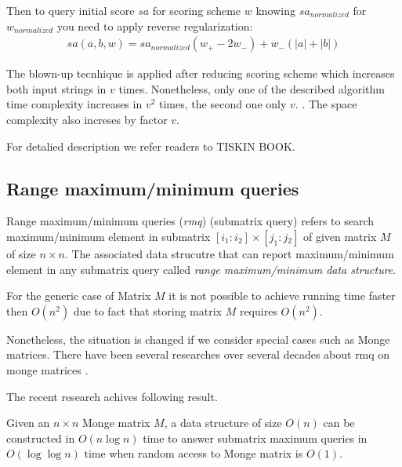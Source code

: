 Then to query initial score $sa$ for scoring scheme $w$
knowing $sa_{normalized}$ for $w_{normalized}$ you need to apply reverse regularization:
\begin{equation}
    \begin{aligned}
    sa(a,b,w) = sa_{normalized}  (w_{+} - 2w_{-}) +  w_{-} (|a| + |b|)
\end{aligned}
\end{equation}

The blown-up tecnhique is applied after reducing scoring scheme
which increases both input strings in $v$ times.
Nonetheless, only one of the described algorithm time complexity increases in $v^{2}$ times, the second one only $v$. .
The space complexity also increses by factor $v$. 


For detalied description we refer readers to TISKIN BOOK\cite{}.

 
\subsection{Range maximum/minimum queries}

Range maximum/minimum queries (\emph{rmq}) (submatrix query)  refers to search maximum/minimum element in submatrix $[i_{1}:i{_2}]\times [j_{1}:j{_2}]$ of given matrix $M$ of size $n\times n$.
The associated data strucutre that can report maximum/minimum element in any  submatrix query called \emph{range maximum/minimum data structure}.

For the generic case of Matrix $M$ it is not possible to
achieve running time faster then $O(n^2)$ due to fact that storing matrix $M$ requires $O(n^2)$.

Nonetheless, the situation is changed if we  consider special cases such as Monge matrices.
There have been several researches over several decades about 
rmq on monge matrices \cite{}.

The recent research achives following result\cite{}.

\begin{theorem}\cite{}
Given an $n \times n$ Monge matrix $M$, a data structure of size $O(n)$ can be constructed
in $O(n \log n)$ time to answer submatrix maximum queries in $O(\log \log n)$ time when random access to Monge matrix is $O(1)$.
\end{theorem}


